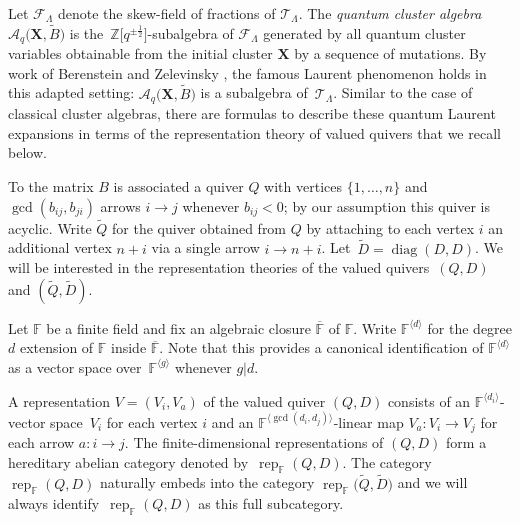 \documentclass[pdftex]{sigma}
\newcommand{\bfX}{\mathbf{X}}
\newcommand{\cA}{\mathcal{A}}
\newcommand{\cF}{\mathcal{F}}
\newcommand{\cT}{\mathcal{T}}
\newcommand{\FF}{\mathbb{F}}
\newcommand{\half}{{\frac{1}{2}}}
\newcommand{\rep}{\operatorname{rep}}
\newcommand{\ZZ}{\mathbb{Z}}
\numberwithin{equation}{section}
\begin{document}
 Let $\cF_\Lambda$ denote the skew-field of fractions of $\cT_\Lambda$. The {\it quantum cluster algebra} $\cA_q\big(\bfX,\widetilde{B}\big)$ is the~$\ZZ\big[q^{\pm\half}\big]$-subalgebra of $\cF_\Lambda$ generated by all quantum cluster variables obtainable from the initial cluster $\bfX$ by a sequence of mutations. By work of Berenstein and Zelevinsky \cite{berenstein-zelevinsky}, the famous Laurent phenomenon holds in this adapted setting: $\cA_q\big(\bfX,\widetilde{B}\big)$ is a subalgebra of~$\cT_\Lambda$. Similar to the case of classical cluster algebras, there are formulas to describe these quantum Laurent expansions in terms of the representation theory of valued quivers that we recall below.

To the matrix $B$ is associated a quiver $Q$ with vertices $\{1,\ldots,n\}$ and $\gcd(b_{ij},b_{ji})$ arrows $i\to j$ whenever $b_{ij}<0$; by our assumption this quiver is acyclic. Write $\widetilde{Q}$ for the quiver obtained from $Q$ by attaching to each vertex $i$ an additional vertex $n+i$ via a single arrow $i\to n+i$. Let~$\widetilde{D}=\operatorname{diag}(D,D)$. We will be interested in the representation theories of the valued quivers~$(Q,D)$ and $(\widetilde{Q},\widetilde{D})$.

Let $\FF$ be a finite field and fix an algebraic closure $\overline{\FF}$ of $\FF$. Write $\FF^{\langle d\rangle}$ for the degree $d$ extension of $\FF$ inside $\overline{\FF}$. Note that this provides a canonical identification of $\FF^{\langle d\rangle}$ as a vector space over~$\FF^{\langle g\rangle}$ whenever $g|d$.

A representation $V=(V_i,V_a)$ of the valued quiver $(Q,D)$ consists of an $\FF^{\langle d_i\rangle}$-vector space~$V_i$ for each vertex $i$ and an $\FF^{\langle\gcd(d_i,d_j)\rangle}$-linear map $V_a\colon V_i\to V_j$ for each arrow $a\colon i\to j$. The finite-dimensional representations of $(Q,D)$ form a hereditary abelian category denoted by~$\rep_\FF(Q,D)$. The category $\rep_\FF(Q,D)$ naturally embeds into the category $\rep_\FF\big(\widetilde{Q},\widetilde{D}\big)$ and we will always identify~$\rep_\FF(Q,D)$ as this full subcategory.
\end{document}
